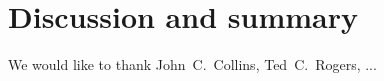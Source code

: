 \documentclass[pdftex,twocolumn,epjc3]{svjour3}          %
\begin{document}
\section{Discussion and summary}

\begin{acknowledgements}

We would like to thank
John~C.~Collins,
Ted~C.~Rogers,
...

\end{acknowledgements}







\end{document}
